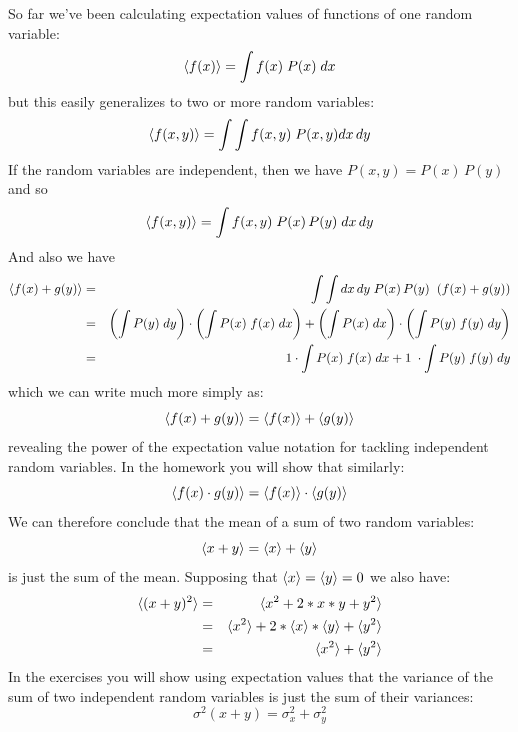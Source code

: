 \documentclass[12pt]{article}
\begin{document}
So far we've been calculating expectation values of functions of one random variable: 
\begin{displaymath}
\braket{f(x)} = \int f(x) \; P(x) \; dx
\end{displaymath}
but this easily generalizes to two or more random variables:
\begin{displaymath}
\braket{f(x,y)} = \int \int f(x,y) \; P(x,y) dx \, dy 
\end{displaymath}
If the random variables are independent, then we have $P(x,y) = P(x) \, P(y)$ and so
\begin{displaymath}
\braket{f(x,y)} = \int f(x,y) \; P(x) \, P(y) \; dx \, dy
\end{displaymath}
And also we have
\begin{eqnarray*}
\braket{f(x)+g(y)} &=& \int \int dx \, dy \; P(x) \, P(y) \;\; (f(x) + g(y)) \\
&=& \left(\int P(y) \; dy \right) \cdot \left( \int P(x) \; f(x) \; dx  \right) 
+ \left(\int P(x) \; dx \right) \cdot \left( \int P(y) \; f(y) \; dy  \right)\\
&=& 1 \cdot \int P(x) \; f(x) \; dx  + 1 \; \cdot \int P(y) \; f(y) \; dy \\
\end{eqnarray*}
which we can write much more simply as:
\begin{displaymath}
\braket{f(x)+g(y)} = \braket{f(x)}+\braket{g(y)}
\end{displaymath}
revealing the power of the expectation value notation for tackling independent random variables.  In the homework you will show that similarly:
\begin{equation}
\braket{f(x) \cdot g(y)} = \braket{f(x)} \cdot \braket{g(y)} \label{eqn:expprod}
\end{equation}
We can therefore conclude that the mean of a sum of two random variables:
\begin{displaymath}
\braket{x + y} = \braket{x} + \braket{y} 
\end{displaymath}
is just the sum of the mean.  Supposing that $\braket{x} = \braket{y} = 0$ we also have:
\begin{eqnarray*}
\braket{(x + y)^2} &=& \braket{x^2 + 2*x*y + y^2} \\
&=& \braket{x^2} + 2*\braket{x}*\braket{y} + \braket{y^2} \\
&=& \braket{x^2} + \braket{y^2} \\
\end{eqnarray*}
In the exercises you will show using expectation values that the variance of the sum of two independent random variables is just the sum of their variances:
\begin{displaymath}
\sigma^2(x+y) = \sigma^2_x + \sigma^2_y
\end{displaymath}
\end{document}

